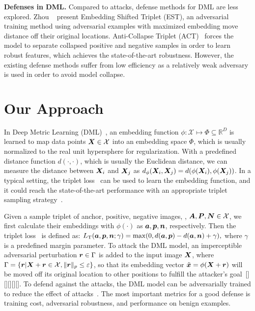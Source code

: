 \documentclass[10pt,twocolumn,letterpaper]{article}
\begin{document}
%
\textbf{Defenses in DML.} Compared to attacks, defense methods for DML are less
explored.
%
Zhou \etal~\cite{advrank} present Embedding Shifted Triplet (EST), an
adversarial training method using adversarial examples with maximized embedding
move distance off their original locations.
%
Anti-Collapse Triplet (ACT)~\cite{robrank} forces the model to separate
collapsed positive and negative samples in order to learn robust features,
which achieves the state-of-the-art robustness.
%
However, the existing defense methods suffer from low efficiency as a
relatively weak adversary is used in order to avoid model collapse.

\section{Our Approach}
\label{sec:3}


In Deep Metric Learning (DML)~\cite{revisiting,dmlreality}, an embedding
function $\phi:\mathcal{X}\mapsto \Phi \subseteq \mathbb{R}^D$ is learned to
map data points ${\bm{X}}\in\mathcal{X}$ into an embedding space $\Phi$, which is usually
normalized to the real unit hypersphere for regularization.
%
With a predefined distance function $d(\cdot,\cdot)$, which is usually the
Euclidean distance, we can measure the distance between ${\bm{X}}_i$ and ${\bm{X}}_j$ as
$d_\phi({\bm{X}}_i,{\bm{X}}_j)=d(\phi({\bm{X}}_i),\phi({\bm{X}}_j))$.
%
In a typical setting, the triplet loss~\cite{facenet} can be used to learn the
embedding function, and it could reach the state-of-the-art performance with an
appropriate triplet sampling strategy~\cite{revisiting}.


Given a sample triplet of anchor, positive, negative images, \ie, ${\bm{A}}, {\bm{P}},
{\bm{N}} \in \mathcal{X}$, we first calculate their embeddings with $\phi(\cdot)$ as
${\bm{a}}, {\bm{p}}, {\bm{n}}$, respectively.
%
Then the triplet loss~\cite{facenet} is defined as:
%
$
%
	L_\text{T}(\va, \vp, \vn; \gamma) = \max(0, d(\va, \vp) - d(\va, \vn) +
	\gamma),
%
$
%
where $\gamma$ is a predefined margin parameter.
%
To attack the DML model, an imperceptible adversarial perturbation ${\bm{r}} \in
\Gamma$ is added to the input image ${\bm{X}}$, where $\Gamma = \{{\bm{r}} | {\bm{X}}+{\bm{r}}\in
\mathcal{X},  \|{\bm{r}}\|_p \leq \varepsilon\}$, so that its embedding vector
$\tilde{{\bm{x}}}=\phi({\bm{X}}+{\bm{r}})$ will be moved off its original location to other
positions to fulfill the attacker's goal~[][][][][].
%
To defend against the attacks, the DML model can be adversarially trained to
reduce the effect of attacks~\cite{advrank,robrank}.
%
The most important metrics for a good defense is training cost, adversarial
robustness, and performance on benign examples.
\end{document}
